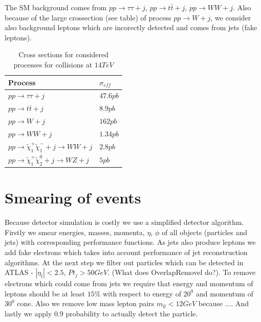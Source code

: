 \documentclass[tightenline,notitlepage,nofootinbib]{revtex4-1}
\begin{document}
  The SM background comes from $pp\rightarrow \tau \tau + j$, $pp\rightarrow t \bar t + j$, $pp \rightarrow WW + j$. Also because of the large crossection (see table) of process $pp \rightarrow W +j$, we consider also background leptons which are incorectly detected and comes from jets (fake leptons). 
\begin{table}[!ht]
  \centering
  \begin{tabular}{ll}
    Process & $\sigma_{eff}$ \\
    \hline
    $pp\rightarrow \tau \tau + j$ & $47.6 pb$\\
    $pp\rightarrow t \bar t + j$ & $ 8.9pb$\\
    $pp \rightarrow W + j$ &  $162pb$ \\
    $pp \rightarrow WW +j$ & $1.34 pb$\\
    $pp \rightarrow \tilde \chi_1^{+}\tilde \chi_1^{-} + j \rightarrow WW + j$ & $2.8pb$\\
    $pp \rightarrow \tilde \chi_1^{+}\tilde \chi_2^{0} + j \rightarrow WZ + j$ & $5pb$\\
  \end{tabular}
  \caption{Cross sections for considered processes for collisions at $14 TeV$}
\end{table}

\section{Smearing of events}

Because detector simulation is costly we use a simplified detector algorithm. Firstly we smear energies, masses, momenta, $\eta$, $\phi$ of all objects (particles and jets) with corresponding performance functions. As jets also produce leptons we add fake electrons which takes into account performance of jet reconstruction algorithms. At the next step we filter out particles which can be detected in ATLAS - $|\eta_l|<2.5$, $Pt_j>50 GeV$. (What does OverlapRemovel do?). To remove electrons which could come from jets we require that energy and momentum of leptons should be at least $15\%$ with respect to energy of $20^0$ and momentum of $30^0$ cone. Also we remove low mass lepton pairs $m_{ll}<12 GeV$ because .... And lastly we apply $0.9$ probability to actually detect the particle.
\end{document}
